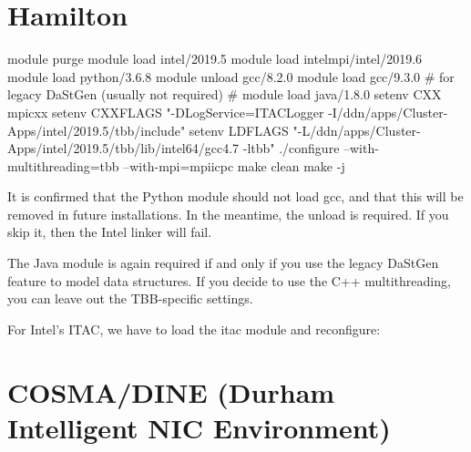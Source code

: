 





\section{Hamilton}


\begin{code}
 module purge
 module load intel/2019.5
 module load intelmpi/intel/2019.6
 module load python/3.6.8 
 module unload gcc/8.2.0
 module load gcc/9.3.0
 # for legacy DaStGen (usually not required)
 # module load java/1.8.0
 setenv CXX mpicxx
 setenv CXXFLAGS "-DLogService=ITACLogger -I/ddn/apps/Cluster-Apps/intel/2019.5/tbb/include"
 setenv LDFLAGS "-L/ddn/apps/Cluster-Apps/intel/2019.5/tbb/lib/intel64/gcc4.7 -ltbb"
 ./configure --with-multithreading=tbb --with-mpi=mpiicpc
 make clean
 make -j
\end{code}





\begin{remark}
 It is confirmed that the Python module should not load gcc, and that this will
 be removed in future installations.
 In the meantime, the unload is required.
 If you skip it, then the Intel linker will fail.
\end{remark}

\noindent
The Java module is again required if and only if you use the legacy DaStGen
feature to model data structures.
If you decide to use the C++ multithreading, you can leave out the TBB-specific
settings.


For Intel's ITAC, we have to load the itac module and reconfigure:



\section{COSMA/DINE (Durham Intelligent NIC Environment)}


